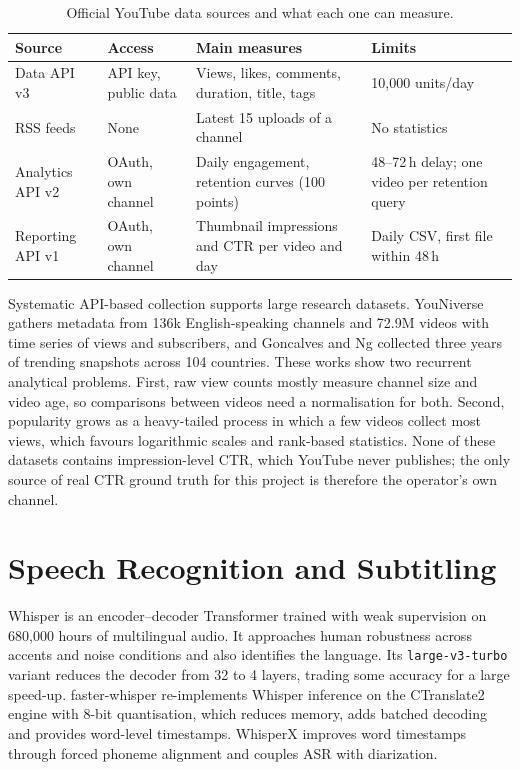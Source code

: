 \begin{table}[H]
\centering
\caption{Official YouTube data sources and what each one can measure.}
\label{tab:apis}
\small
\begin{tabular}{@{}p{3.0cm}p{3.6cm}p{4.2cm}p{3.6cm}@{}}
\toprule
\textbf{Source} & \textbf{Access} & \textbf{Main measures} & \textbf{Limits} \\
\midrule
Data API v3 & API key, public data & Views, likes, comments, duration, title, tags & 10{,}000 units/day \\
RSS feeds & None & Latest 15 uploads of a channel & No statistics \\
Analytics API v2 & OAuth, own channel & Daily engagement, retention curves (100 points) & 48--72\,h delay; one video per retention query \\
Reporting API v1 & OAuth, own channel & Thumbnail impressions and CTR per video and day & Daily CSV, first file within 48\,h \\
\bottomrule
\end{tabular}
\end{table}

Systematic API-based collection supports large research datasets. YouNiverse \cite{ribeiro2021youniverse} gathers metadata from 136k English-speaking channels and 72.9M videos with time series of views and subscribers, and Goncalves and Ng \cite{goncalves2026trending} collected three years of trending snapshots across 104 countries. These works show two recurrent analytical problems. First, raw view counts mostly measure channel size and video age, so comparisons between videos need a normalisation for both. Second, popularity grows as a heavy-tailed process in which a few videos collect most views, which favours logarithmic scales and rank-based statistics. None of these datasets contains impression-level CTR, which YouTube never publishes; the only source of real CTR ground truth for this project is therefore the operator's own channel.

\section{Speech Recognition and Subtitling}

Whisper \cite{radford2023whisper} is an encoder--decoder Transformer trained with weak supervision on 680{,}000 hours of multilingual audio. It approaches human robustness across accents and noise conditions and also identifies the language. Its \texttt{large-v3-turbo} variant reduces the decoder from 32 to 4 layers, trading some accuracy for a large speed-up. faster-whisper \cite{fasterwhisper} re-implements Whisper inference on the CTranslate2 engine with 8-bit quantisation, which reduces memory, adds batched decoding and provides word-level timestamps. WhisperX \cite{bain2023whisperx} improves word timestamps through forced phoneme alignment and couples ASR with diarization.

